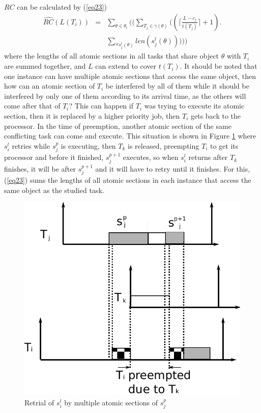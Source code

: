 \documentclass[a4paper,english]{article}
\begin{document}
$RC$ can be calculated by (\ref{eq23})\begin{eqnarray}
\hat{RC}(L(T_{i})) & = & \sum_{\theta\in\theta_{i}}((\sum_{T_{j}\in\gamma(\theta)}((\lceil\frac{L-c_{j}}{t(T_{j})}\rceil+1).\nonumber \\
 &  & \sum_{\forall s_{j}^{l}(\theta)}len(s_{j}^{l}(\theta)))))\label{eq23}\end{eqnarray}
where the lengths of all atomic sections in all tasks that share object
$\theta$ with $T_{i}$ are summed together, and $L$ can extend to
cover $t(T_{i})$. It should be noted that one instance can have multiple
atomic sections that access the same object, then how can an atomic
section of $T_{i}$ be interfered by all of them while it should be
interfered by only one of them according to its arrival time, as the
others will come after that of $T_{i}$? This can happen if $T_{i}$
was trying to execute its atomic section, then it is replaced by a
higher priority job, then $T_{i}$ gets back to the processor. In
the time of preemption, another atomic section of the same conflicting
task can come and execute. This situation is shown in Figure \ref{fig13}
where $s_{i}^{l}$ retries while $s_{j}^{p}$ is executing, then $T_{k}$
is released, preempting $T_{i}$ to get its processor and before it
finished, $s_{j}^{p+1}$ executes, so when $s_{i}^{l}$ returns after
$T_{k}$ finishes, it will be after $s_{j}^{p+1}$ and it will have
to retry until it finishes. For this, (\ref{eq23}) sums the lengths
of all atomic sections in each instance that access the same object
as the studied task.

%
\begin{figure}
\centering{}\includegraphics[scale=0.5]{figures/figure13}\caption{\label{fig13}Retrial of $s_{i}^{l}$ by multiple atomic sections of $s_{j}^{p}$}
\end{figure}
\end{document}
